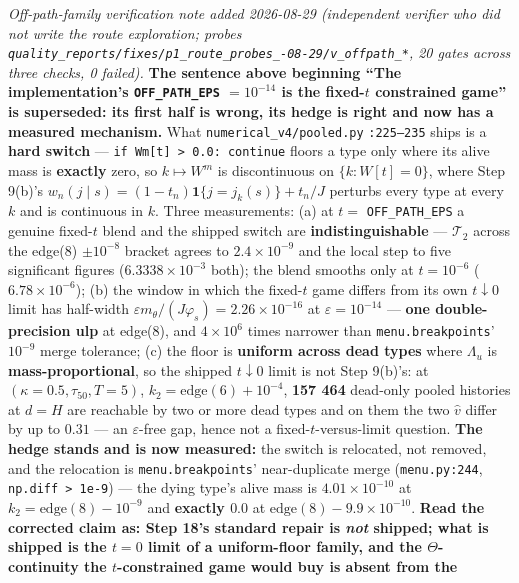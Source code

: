 \documentclass[11pt,a4paper]{article}
\newcommand{\ind}{\mathbf{1}}
\newcommand{\Tmap}{\mathcal{T}}
\begin{document}
\begin{description}[leftmargin=1.9em,style=unboxed]
  \emph{Off-path-family verification note added 2026-08-29 (independent verifier who did not
  write the route exploration; probes
  \texttt{quality\_reports/\allowbreak fixes/\allowbreak p1\_route\_probes\_-08-29/v\_offpath\_*},
  20 gates across three checks, 0 failed).} \textbf{The sentence above beginning ``The
  implementation's \texttt{OFF\_PATH\_EPS} $=10^{-14}$ \textbf{is} the fixed-$t$ constrained
  game'' is superseded: its first half is wrong, its hedge is right and now has a measured
  mechanism.} What \texttt{numerical\_v4/pooled.py} \texttt{:225--235} ships is a
  \textbf{hard switch} --- \texttt{if Wm[t] > 0.0: continue} floors a type only where its
  alive mass is \textbf{exactly} zero, so $k\mapsto W^m$ is discontinuous on $\{k:W[t]=0\}$,
  where Step 9(b)'s $w_n(j\mid s)=(1-t_n)\ind\{j=j_k(s)\}+t_n/J$ perturbs every type at every
  $k$ and is continuous in $k$. Three measurements: (a) at $t=$ \texttt{OFF\_PATH\_EPS} a
  genuine fixed-$t$ blend and the shipped switch are \textbf{indistinguishable} --- $\Tmap_2$
  across the edge(8) $\pm10^{-8}$ bracket agrees to $2.4\times10^{-9}$ and the local step to
  five significant figures ($6.3338\times10^{-3}$ both); the blend smooths only at
  $t=10^{-6}$ ($6.78\times10^{-6}$); (b) the window in which the fixed-$t$ game differs from
  its own $t\downarrow0$ limit has half-width $\varepsilon m_\theta/(J\varphi_s) =
  2.26\times10^{-16}$ at $\varepsilon=10^{-14}$ --- \textbf{one double-precision ulp} at
  edge(8), and $4\times10^{6}$ times narrower than \texttt{menu.breakpoints}' $10^{-9}$
  merge tolerance; (c) the floor is \textbf{uniform across dead types} where $\Lambda_u$ is
  \textbf{mass-proportional}, so the shipped $t\downarrow0$ limit is not Step 9(b)'s: at
  $(\kappa{=}0.5,\tau_{50},T{=}5)$, $k_2=\text{edge}(6)+10^{-4}$, \textbf{157 464} dead-only
  pooled histories at $d=H$ are reachable by two or more dead types and on them the two
  $\hat v$ differ by up to $0.31$ --- an $\varepsilon$-free gap, hence not a
  fixed-$t$-versus-limit question. \textbf{The hedge stands and is now measured:} the switch
  is relocated, not removed, and the relocation is \texttt{menu.breakpoints}' near-duplicate
  merge (\texttt{menu.py:244}, \texttt{np.diff > 1e-9}) --- the dying type's alive mass is
  $4.01\times10^{-10}$ at $k_2=\text{edge}(8)-10^{-9}$ and \textbf{exactly $0.0$} at
  $\text{edge}(8)-9.9\times10^{-10}$. \textbf{Read the corrected claim as: Step 18's standard
  repair is \emph{not} shipped; what is shipped is the $t=0$ limit of a uniform-floor family,
  and the $\Theta$-continuity the $t$-constrained game would buy is absent from the
}
\end{description}
\end{document}
